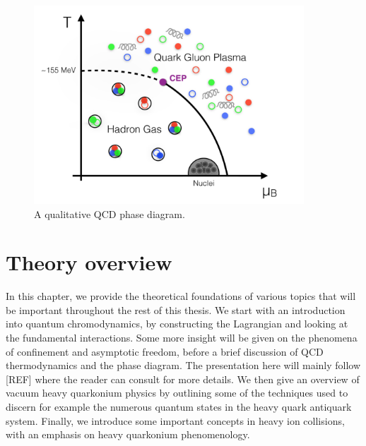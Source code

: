 \documentclass[12pt, a4paper, twoside]{book}
\begin{document}
\begin{figure}
	\centering
	\includegraphics[width=0.9\textwidth]{QCDphase}
	\caption{A qualitative QCD phase diagram.}\label{fig:QCDphasediag}
\end{figure}

\chapter{Theory overview}
\label{sec:theory_ov}
\onehalfspacing
In this chapter, we provide the theoretical foundations of various topics that will be important throughout the rest of this thesis. We start with an introduction into quantum chromodynamics, by constructing the Lagrangian and looking at the fundamental interactions. Some more insight will be given on the phenomena of confinement and asymptotic freedom, before a brief discussion of QCD thermodynamics and the phase diagram. The presentation here will mainly follow [REF] where the reader can consult for more details. We then give an overview of vacuum heavy quarkonium physics by outlining some of the techniques used to discern for example the numerous quantum states in the heavy quark antiquark system. Finally, we introduce some important concepts in heavy ion collisions, with an emphasis on heavy quarkonium phenomenology. 
\end{document}
